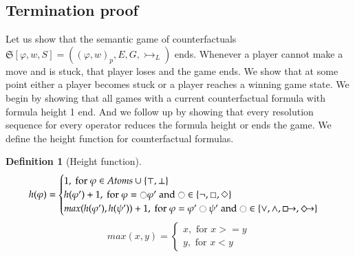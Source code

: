 \documentclass[a4paper,american]{paper}
\theoremstyle{definition}\newtheorem{definition}{Definition}
\begin{document}
\subsection{Termination proof}
Let us show that the semantic game of counterfactuals $\mathfrak{S}[\varphi,w,S]=((\varphi ,w)_p, E, G, \rightarrowtail_L)$ ends. Whenever a player cannot make a move and is stuck, that player loses and the game ends. We show that at some point either a player becomes stuck or a player reaches a winning game state. We begin by showing that all games with a current counterfactual formula with formula height 1 end. And we follow up by showing that every resolution sequence for every operator reduces the formula height or ends the game. We define the height function for counterfactual formulas.
\begin{definition}[Height function]
\[h(\varphi) = 
\begin{cases}
1,\text{ for }\varphi\in Atoms\cup\{\top ,\bot\}\\
h(\varphi') + 1,\text{ for }\varphi=\ocircle\varphi'\text{ and }\ocircle\in\{\neg ,\Box ,\Diamond\}\\
max(h(\varphi'),h(\psi')) + 1,\text{ for }\varphi=\varphi'\ocircle\psi'\text{ and }\ocircle\in\{\vee ,\wedge ,\boxright ,\Diamondright\}
\end{cases}\]
\[max(x, y) =
\begin{cases}
x,\text{ for }x>=y\\
y,\text{ for }x<y
\end{cases}\]
\end{definition}
\end{document}
